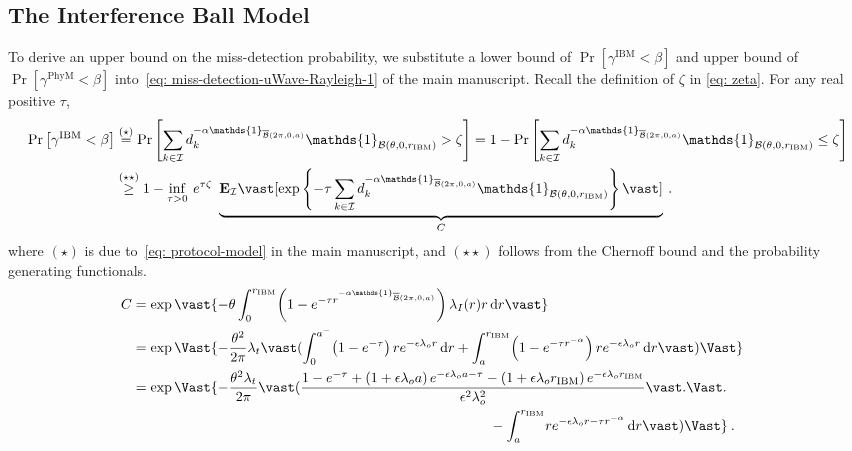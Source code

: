 \documentclass[12pt, draftclsnofoot, onecolumn]{IEEEtran}
\begin{document}
\subsection{The Interference Ball Model}
To derive an upper bound on the miss-detection probability, we substitute a lower bound of
$\Pr \left[\gamma^{\mathrm{IBM}} < \beta \right]$ and upper bound of $\Pr \left[\gamma^{\mathrm{PhyM}} < \beta \right]$ into~\eqref{eq: miss-detection-uWave-Rayleigh-1} of the main manuscript. Recall the definition of $\zeta$ in \eqref{eq: zeta}. For any real positive $\tau$,
\begin{align}\label{eq: Chernoff-bound-1}
\Pr \left[\gamma^{\mathrm{IBM}} < \beta \right]  & \stackrel{(\star)}{=} \Pr \left[ \sum_{k \in \mathcal{I}} d_{k}^{-\alpha  \mathds{1}_{\overline{\mathcal{B}}(2\pi,0,a)}} \mathds{1}_{\mathcal{B}(\theta,0,r_{\mathrm{IBM}})} > \zeta \right] =
1 - \Pr \left[ \sum_{k \in \mathcal{I}} d_{k}^{-\alpha  \mathds{1}_{\overline{\mathcal{B}}(2\pi,0,a)}} \mathds{1}_{\mathcal{B}(\theta,0,r_{\mathrm{IBM}})} \leq \zeta \right] \nonumber \\
& \stackrel{(\star \star)}{\geq} 1 - \inf\limits_{\tau > 0} \: e^{\tau\zeta}~ \underbrace{\mathbf{E}_{\mathcal{I}} \vast[\exp\left\{-\tau \sum_{k \in \mathcal{I}} d_{k}^{-\alpha  \mathds{1}_{\overline{\mathcal{B}}(2\pi,0,a)}} \mathds{1}_{\mathcal{B}(\theta,0,r_{\mathrm{IBM}})}\right\} \vast]}_{C}  \:.
\end{align}
where $(\star)$ is due to~\eqref{eq: protocol-model} in the main manuscript, and $(\star \star)$ follows from the Chernoff bound and the probability generating functionals.
\begin{align}\label{eq: Cambell-theorem-1}
\hspace{-5mm}
C & = \exp\vast\{ - \theta \int_{0}^{r_{\mathrm{IBM}}} \! \left( 1 - e^{-\tau r^{-\alpha  \mathds{1}_{\overline{\mathcal{B}}(2\pi,0,a)}} } \right) \lambda_I (r) r \, \mathrm{d}r \vast\} \nonumber \\
&= \exp\Vast\{ - \frac{\theta^2}{2\pi}\lambda_t \vast( \int_{0}^{a^{-}} \! \left( 1 - e^{-\tau} \right) r e^{-\epsilon\lambda_o r} \, \mathrm{d}r + \int_{a}^{r_{\mathrm{IBM}}} \! \left( 1 - e^{-\tau r^{-\alpha}} \right) r e^{-\epsilon\lambda_o r} \, \mathrm{d}r \vast) \Vast\} \nonumber \\
& = \exp \Vast\{ - \frac{ \theta^2 \lambda_t}{2\pi } \vast( \frac{1 - e^{-\tau} + \left( 1 + \epsilon\lambda_o a\right)e^{-\epsilon\lambda_o a - \tau } - \left( 1 + \epsilon\lambda_o r_{\mathrm{IBM}} \right)e^{-\epsilon\lambda_o r_{\mathrm{IBM}}}}{\epsilon^2 \lambda_{o}^{2}} \vast. \Vast. \nonumber \\
 & \hspace{90mm} - \int_{a}^{r_{\mathrm{IBM}}} \! r e^{-\epsilon\lambda_o r -\tau r^{-\alpha}} \, \mathrm{d}r \vast) \Vast\} \:.
\end{align}
\end{document}
